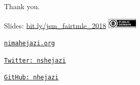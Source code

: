 \documentclass[12pt,t,handout]{beamer}
\begin{document}

\begin{frame}[c]{Thank you.}

\Large
Slides: \href{https://bit.ly/jsm_fairtmle_2018}{bit.ly/jsm\_fairtmle\_2018}
\quad \includegraphics[height=5mm]{Figs/cc-zero.png}

\vspace{2mm}
\href{http://nimahejazi.org}{\tt nimahejazi.org}

\vspace{2mm}
\href{https://twitter.com/nshejazi}{\tt Twitter: nshejazi}

\vspace{2mm}
\href{https://github.com/nhejazi}{\tt GitHub: nhejazi}


\end{frame}

\end{document}
